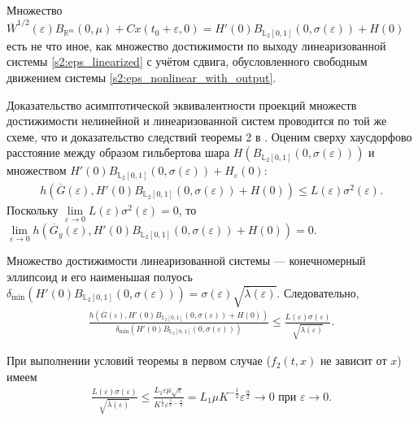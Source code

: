 \documentclass[../main.tex]{subfiles}
\begin{document}
 Множество $\overline{W}^{1/2}(\varepsilon)B_{\mathbb{R}^m}(0,\mu) + Cx(t_0+\varepsilon,0) = H'(0)B_{\mathbb{L}_2[0,1]}(0,\sigma(\varepsilon))+ H(0)$ есть не что иное, как множество достижимости по выходу линеаризованной системы \eqref{s2:eps_linearized} с учётом сдвига, обусловленного свободным движением системы \eqref{s2:eps_nonlinear_with_output}.
 
 Доказательство асимптотической эквивалентности проекций множеств достижимости нелинейной и линеаризованной систем проводится по той же схеме, что и доказательство следствий теоремы 2 в \cite{GusevUMJ}. 
Оценим сверху хаусдорфово расстояние между образом гильбертова шара $ H\left( B_{\mathbb{L}_2[0,1]}(0,\sigma(\varepsilon))\right) $ и множеством $ H'(0)B_{\mathbb{L}_2[0,1]}(0,\sigma(\varepsilon))+ H_{\varepsilon}(0) $:
 \begin{gather*}
 h\left( \overline{G}(\varepsilon), H'(0)B_{\mathbb{L}_2[0,1]}(0,\sigma(\varepsilon))+ H(0)\right) \leqslant L(\varepsilon) \sigma^2(\varepsilon).
 \end{gather*}
 Поскольку $ \lim\limits_{\varepsilon \rightarrow 0} L(\varepsilon) \sigma^2(\varepsilon) = 0 $, то $ \lim\limits_{\varepsilon \rightarrow 0} h\left( \overline{G}_y(\varepsilon), H'(0)B_{\mathbb{L}_2[0,1]}(0,\sigma(\varepsilon))+ H(0)\right) = 0 $.
 
 
 Множество достижимости линеаризованной системы --- конечномерный эллипсоид и его наименьшая полуось $ \delta_{\min}\left(H'(0)B_{\mathbb{L}_2[0,1]}(0,\sigma(\varepsilon)) \right)=\sigma(\varepsilon)\sqrt{\overline{\lambda}(\varepsilon)} $. 
 Следовательно,
 \begin{gather*}
 \frac{h\left(\overline{G}(\varepsilon), H'(0)B_{\mathbb{L}_2[0,1]}(0,\sigma(\varepsilon))+ H(0)\right) }{\delta_{\min}\left( H'(0)B_{\mathbb{L}_2[0,1]}(0,\sigma(\varepsilon))\right) } \leqslant \frac{L(\varepsilon) \sigma(\varepsilon)}{\sqrt{\overline{\lambda}(\varepsilon)}}.
 \end{gather*}
 
 При выполнении условий теоремы в первом случае ($ f_2(t,x) $ не зависит от $ x $) имеем
 \begin{gather*}
 \frac{L(\varepsilon) \sigma(\varepsilon)}{\sqrt{\overline{\lambda}(\varepsilon)}} 
 \leqslant
 \frac{L_1\varepsilon\mu\sqrt{\varepsilon}}{K^{\frac{1}{2}}\varepsilon^{\frac{3}{2}-\frac{\alpha}{2}}} 
 =
 L_1\mu K^{-\frac{1}{2}}\varepsilon^{\frac{\alpha}{2}} \rightarrow 0 \mbox{\ при\ } \varepsilon \rightarrow 0.
 \end{gather*}
 
\end{document}
